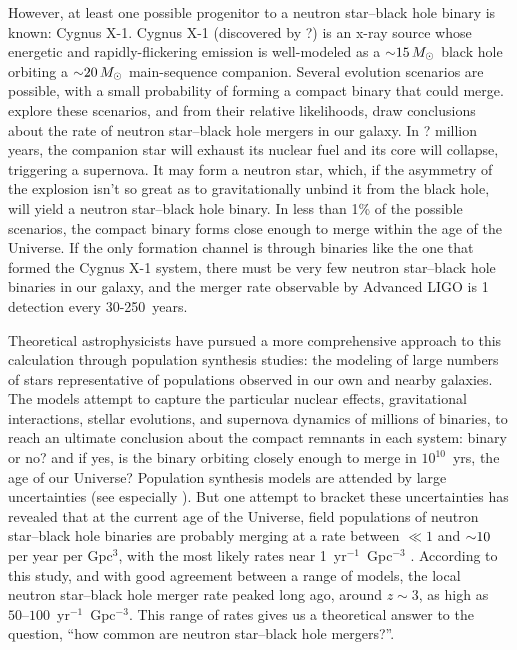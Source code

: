 However, at least one possible progenitor to a neutron star--black hole \nsbh
binary is known: Cygnus X-1. Cygnus X-1 (discovered by ?)
is an x-ray source whose energetic and rapidly-flickering emission
is well-modeled as a $\mathord{\sim}15\,M_\odot$ black hole orbiting a $\mathord{\sim}20\,M_\odot$
main-sequence companion.
Several evolution scenarios are possible, with a small probability of forming
a compact binary that could merge.
\citet{belc2011-cyg_x1}
explore these scenarios, and from their relative likelihoods, draw conclusions
about the rate of neutron star--black hole \nsbh mergers in our galaxy.
In ? million years,
the companion star will exhaust its nuclear fuel and its core will collapse,
triggering a supernova. It may form a neutron star, which, if the asymmetry of
the explosion isn't so great as to gravitationally unbind it from the black hole,
will yield a neutron star--black hole \nsbh binary. In less than 1\% of the possible
scenarios, the compact binary forms close enough to merge within the age of the
Universe. If the only formation channel is through
binaries like the one that formed the Cygnus X-1 system, there must be very few
neutron star--black hole \nsbh binaries in our galaxy, and the merger rate observable
by Advanced LIGO is 1 detection every 30-250~years.

Theoretical astrophysicists have pursued a more comprehensive approach to this
calculation through population synthesis studies: the modeling of large numbers
of stars representative of populations observed in our own and nearby galaxies.
The models attempt to capture the particular nuclear effects, gravitational
interactions, stellar evolutions, and supernova dynamics of millions of binaries,
to reach an ultimate conclusion about the compact remnants in each system:
binary or no? and if yes, is the binary orbiting closely enough to merge in
$10^{10}$~yrs, the age of our Universe?
Population synthesis models are attended by large uncertainties
(see especially \citealt{domi2012-merger_rates_part1}).
But one attempt to bracket these uncertainties
has revealed that at the current age of the Universe,
field populations of neutron star--black hole \nsbh binaries are probably
merging at a rate between $\ll1$ and $\mathord{\sim}10$
per year per Gpc$^3$, with the most likely rates near 1~yr$^{-1}$~Gpc$^{-3}$
\citep[Figs.~3 and~5]{domi2013-merger_rates_part2}.
According to this study, and with good agreement between a range of models,
the local neutron star--black hole merger rate peaked long ago,
around $z\sim3$, as high as $50\text{--}100$~yr$^{-1}$~Gpc$^{-3}$.
This range of rates gives us a theoretical answer to the question,
``how common are neutron star--black hole mergers?''.

